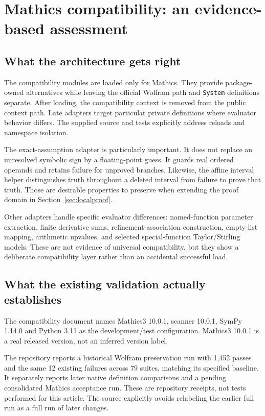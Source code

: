 \documentclass[11pt,letterpaper]{article}
\newcommand{\code}[1]{\nolinkurl{#1}}
\begin{document}
\section{Mathics compatibility: an evidence-based assessment}
\label{sec:mathics}

\subsection{What the architecture gets right}
The compatibility modules are loaded only for Mathics. They provide
package-owned alternatives while leaving the official Wolfram path and
\code{System} definitions separate. After loading, the compatibility context
is removed from the public context path. Late adapters target particular
private definitions where evaluator behavior differs. The supplied source
and tests explicitly address reloads and namespace isolation.
\cite{repo-core,repo-mcompat,repo-mathics,repo-tests}

The exact-assumption adapter is particularly important. It does not replace
an unresolved symbolic sign by a floating-point guess. It guards real ordered
operands and retains failure for unproved branches. Likewise, the affine
interval helper distinguishes truth throughout a deleted interval from
failure to prove that truth. Those are desirable properties to preserve when
extending the proof domain in Section~\ref{sec:localproof}.
\cite{repo-massumptions,repo-msimplification,repo-mbranches}

Other adapters handle specific evaluator differences: named-function
parameter extraction, finite derivative sums, refinement-association
construction, empty-list mapping, arithmetic upvalues, and selected
special-function Taylor/Stirling models. These are not evidence of universal
compatibility, but they show a deliberate compatibility layer rather than
an accidental successful load.
\cite{repo-mcalls,repo-mcalculus,repo-mrefinement,repo-mlists,
repo-mformatting,repo-mtaylor,repo-mspecial}

\subsection{What the existing validation actually establishes}
The compatibility document names Mathics3 10.0.1, scanner 10.0.1, SymPy 1.14.0
and Python 3.11 as the development/test configuration. Mathics3 10.0.1 is a
real released version, not an inferred version label. \cite{repo-mathics,pypi-mathics}

The repository reports a historical Wolfram preservation run with 1,452
passes and the same 12 existing failures across 79 suites, matching its
specified baseline. It separately reports later native definition comparisons
and a pending consolidated Mathics acceptance run. These are repository
receipts, not tests performed for this article. The source explicitly avoids
relabeling the earlier full run as a full run of later changes.
\cite{repo-mathics}
\end{document}
